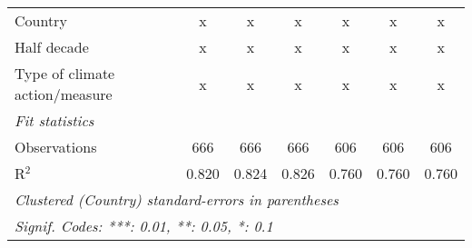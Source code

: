 \begin{tabular}{lcccccc}
   Country                                                & x       & x             & x             & x             & x             & x\\  
   Half decade                                            & x       & x             & x             & x             & x             & x\\  
   Type of climate action/measure                         & x       & x             & x             & x             & x             & x\\  
   \midrule \emph{Fit statistics}\\
   Observations                                           & 666     & 666           & 666           & 606           & 606           & 606\\  
   R$^2$                                                  & 0.820   & 0.824         & 0.826         & 0.760         & 0.760         & 0.760\\  
   \midrule
   \multicolumn{7}{l}{\emph{Clustered (Country) standard-errors in parentheses}}\\
   \multicolumn{7}{l}{\emph{Signif. Codes: ***: 0.01, **: 0.05, *: 0.1}}\\
\end{tabular}
\par\endgroup


